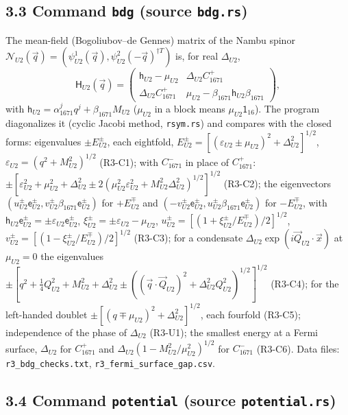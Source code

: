 \documentclass[
  10pt,
]{article}
\begin{document}
\hypertarget{command-bdg-source-bdg.rs}{%
\subsection{\texorpdfstring{3.3 Command \texttt{bdg} (source
\texttt{bdg.rs})}{3.3 Command bdg (source bdg.rs)}}\label{command-bdg-source-bdg.rs}}

The mean-field (Bogoliubov--de Gennes) matrix of the Nambu spinor
\(\mathcal N_{U2}(\vec q)=(\psi^1_{U2}(\vec q),\psi^2_{U2}(-\vec q)^{\dagger T})\)
is, for real \(\Delta_{U2}\),
\[\mathsf H_{U2}(\vec q)=\begin{pmatrix}\mathsf h_{U2}-\mu_{U2}&\Delta_{U2}C^+_{1671}\\ \Delta_{U2}C^+_{1671}&\mu_{U2}-\beta_{1671}\mathsf h_{U2}\beta_{1671}\end{pmatrix},\]
with \(\mathsf h_{U2}=\alpha^j_{1671}q^j+\beta_{1671}M_{U2}\)
(\(\mu_{U2}\) in a block means \(\mu_{U2}\mathsf 1_{16}\)). The program
diagonalizes it (cyclic Jacobi method, \texttt{rsym.rs}) and compares
with the closed forms: eigenvalues \(\pm E^\pm_{U2}\), each eightfold,
\(E^\pm_{U2}=[(\varepsilon_{U2}\pm\mu_{U2})^2+\Delta_{U2}^2]^{1/2}\),
\(\varepsilon_{U2}=(q^2+M^2_{U2})^{1/2}\) (R3-C1); with \(C^-_{1671}\)
in place of \(C^+_{1671}\):
\(\pm[\varepsilon^2_{U2}+\mu^2_{U2}+\Delta^2_{U2}\pm2(\mu^2_{U2}\varepsilon^2_{U2}+M^2_{U2}\Delta^2_{U2})^{1/2}]^{1/2}\)
(R3-C2); the eigenvectors
\((u^\pm_{U2}\mathsf e^\pm_{U2},v^\pm_{U2}\beta_{1671}\mathsf e^\pm_{U2})\)
for \(+E^\mp_{U2}\) and
\((-v^\pm_{U2}\mathsf e^\pm_{U2},u^\pm_{U2}\beta_{1671}\mathsf e^\pm_{U2})\)
for \(-E^\mp_{U2}\), with
\(\mathsf h_{U2}\mathsf e^\pm_{U2}=\pm\varepsilon_{U2}\mathsf e^\pm_{U2}\),
\(\xi^\pm_{U2}=\pm\varepsilon_{U2}-\mu_{U2}\),
\(u^\pm_{U2}=[(1+\xi^\pm_{U2}/E^\mp_{U2})/2]^{1/2}\),
\(v^\pm_{U2}=[(1-\xi^\pm_{U2}/E^\mp_{U2})/2]^{1/2}\) (R3-C3); for a
condensate \(\Delta_{U2}\exp(i\vec Q_{U2}\cdot\vec x)\) at
\(\mu_{U2}=0\) the eigenvalues
\(\pm[q^2+\tfrac14Q^2_{U2}+M^2_{U2}+\Delta^2_{U2}\pm((\vec q\cdot\vec Q_{U2})^2+\Delta^2_{U2}Q^2_{U2})^{1/2}]^{1/2}\)
(R3-C4); for the left-handed doublet
\(\pm[(q\mp\mu_{U2})^2+\Delta^2_{U2}]^{1/2}\), each fourfold (R3-C5);
independence of the phase of \(\Delta_{U2}\) (R3-U1); the smallest
energy at a Fermi surface, \(\Delta_{U2}\) for \(C^+_{1671}\) and
\(\Delta_{U2}(1-M^2_{U2}/\mu^2_{U2})^{1/2}\) for \(C^-_{1671}\) (R3-C6).
Data files: \texttt{r3\_bdg\_checks.txt},
\texttt{r3\_fermi\_surface\_gap.csv}.

\hypertarget{command-potential-source-potential.rs}{%
\subsection{\texorpdfstring{3.4 Command \texttt{potential} (source
\texttt{potential.rs})}{3.4 Command potential (source potential.rs)}}\label{command-potential-source-potential.rs}}
\end{document}
